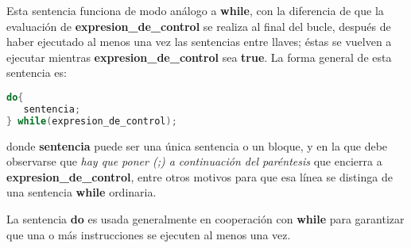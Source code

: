 Esta sentencia funciona de modo análogo a \textbf{while}, con la diferencia de que la evaluación de
\textbf{expresion\_de\_control} se realiza al final del bucle, después de haber ejecutado al menos una
vez las sentencias entre llaves; éstas se vuelven a ejecutar mientras \textbf{expresion\_de\_control} sea
\textbf{true}. La forma general de esta sentencia es:

\begin{lstlisting}[language=C++]
do{
   sentencia;
} while(expresion_de_control);
\end{lstlisting}

donde \textbf{sentencia} puede ser una única sentencia o un bloque, y en la que debe observarse que
\emph{hay que poner (;) a continuación del paréntesis} que encierra a \textbf{expresion\_de\_control}, entre
otros motivos para que esa línea se distinga de una sentencia \textbf{while} ordinaria.

La sentencia \textbf{do} es usada generalmente en cooperación con \textbf{while} para garantizar que una o más
instrucciones se ejecuten al menos una vez.